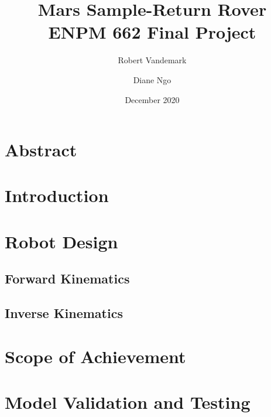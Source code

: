 \documentclass[a4paper, 12pt]{report}
\title{Mars Sample-Return Rover \\
\large ENPM 662 Final Project}
\date{December 2020}
\author{Robert Vandemark \and Diane Ngo}
\begin{document}
	
	\setcounter{page}{1}
	\maketitle
	
	\tableofcontents
	\newpage
	
	\chapter{Abstract}
	
	
	\chapter{Introduction}
	
	
	\chapter{Robot Design}
	
	\section{Forward Kinematics}

	
	
	
	
	\section{Inverse Kinematics}
	
	\chapter{Scope of Achievement}
	
	\chapter{Model Validation and Testing}
	
	\begin{center}
		\printbibliography[heading=bibintoc, title={Bibliography}]
	\end{center}
\end{document}
